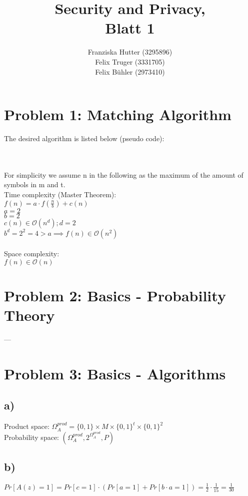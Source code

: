 \documentclass[12pt,pdftex,a4paper]{article}
\title{Security and Privacy,\\ Blatt 1}
\author{Franziska Hutter (3295896)\\
	Felix Truger (3331705)\\
	Felix Bühler (2973410)}
\newcommand\tab[1][1cm]{\hspace*{#1}}
\begin{document}
\maketitle
\pagebreak

\section*{Problem 1: Matching Algorithm}

The desired algorithm is listed below (pseudo code):

\ %
\\~\\
For simplicity we assume n in the following as the maximum of the amount of symbols in m and t.\\
Time complexity (Master Theorem):\\
\tab $f(n) = a \cdot f(\frac{n}{b}) + c(n)$\\
\tab $a = 2$\\
\tab $b = 2$\\
\tab $c(n) \in \mathcal{O}(n^d); d = 2$\\
\tab $b^d = 2^2 = 4 > a \implies f(n) \in \mathcal{O}(n^2)$\\~\\

Space complexity:\\
\tab $f(n)\in \mathcal{O}(n)$

\section*{Problem 2: Basics - Probability Theory}

---

\section*{Problem 3: Basics - Algorithms}

\subsection*{a)} 
Product space: $\Omega_A^{prod} = \{0, 1\} \times M \times \{0, 1\}^t \times \{0, 1\}^2$\\
Probability space: $(\Omega_A^{prod}, 2^{\Omega_A^{prod}}, P)$

\subsection*{b)}
$Pr[A(z) = 1] = Pr[c = 1] \cdot (Pr[a = 1] + Pr[b \cdot a = 1]) = \frac{1}{2} \cdot \frac{1}{15} = \frac{1}{30}$
\end{document}
